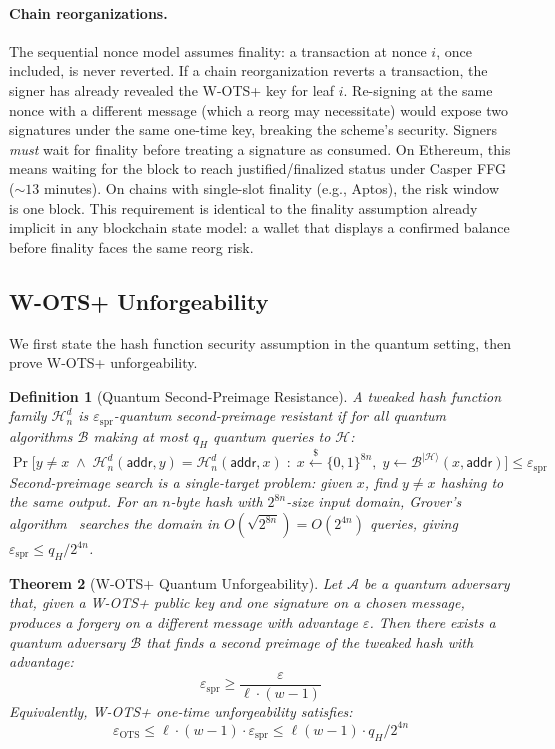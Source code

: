 \documentclass[11pt]{article}
\newtheorem{theorem}{Theorem}
\newtheorem{definition}[theorem]{Definition}
\newcommand{\hash}{\mathcal{H}}
\newcommand{\bin}{\{0,1\}}
\begin{document}
\paragraph{Chain reorganizations.}
The sequential nonce model assumes finality: a transaction at nonce $i$,
once included, is never reverted. If a chain reorganization reverts a
transaction, the signer has already revealed the W-OTS+ key for leaf
$i$. Re-signing at the same nonce with a different message (which a
reorg may necessitate) would expose two signatures under the same
one-time key, breaking the scheme's security. Signers \emph{must}
wait for finality before treating a signature as consumed. On
Ethereum, this means waiting for the block to reach justified/finalized
status under Casper FFG (${\sim}13$ minutes). On chains with
single-slot finality (e.g., Aptos), the risk window is one block.
This requirement is identical to the finality assumption already
implicit in any blockchain state model: a wallet that displays a
confirmed balance before finality faces the same reorg risk.

\subsection{W-OTS+ Unforgeability}

We first state the hash function security assumption in the quantum
setting, then prove W-OTS+ unforgeability.

\begin{definition}[Quantum Second-Preimage Resistance]\label{def:qspr}
A tweaked hash function family $\hash_n^d$ is
$\varepsilon_{\mathrm{spr}}$-quantum second-preimage resistant if for
all quantum algorithms $\mathcal{B}$ making at most $q_H$ quantum
queries to $\hash$:
\[
\Pr\bigl[y \neq x \;\wedge\; \hash_n^d(\mathsf{addr}, y) =
\hash_n^d(\mathsf{addr}, x) \;:\; x \xleftarrow{\$} \bin^{8n},\;
y \leftarrow \mathcal{B}^{|\hash\rangle}(x, \mathsf{addr})\bigr]
\leq \varepsilon_{\mathrm{spr}}
\]
Second-preimage search is a single-target problem: given $x$, find
$y \neq x$ hashing to the same output. For an $n$-byte hash with
$2^{8n}$-size input domain, Grover's algorithm~\cite{grover} searches
the domain in $O(\sqrt{2^{8n}}) = O(2^{4n})$ queries, giving
$\varepsilon_{\mathrm{spr}} \leq q_H / 2^{4n}$.
\end{definition}

\begin{theorem}[W-OTS+ Quantum Unforgeability]\label{thm:ots}
Let $\mathcal{A}$ be a quantum adversary that, given a W-OTS+ public
key and one signature on a chosen message, produces a forgery on a
different message with advantage $\varepsilon$. Then there exists a
quantum adversary $\mathcal{B}$ that finds a second preimage of the
tweaked hash with advantage:
\[
\varepsilon_{\mathrm{spr}} \geq \frac{\varepsilon}{\ell \cdot (w - 1)}
\]
Equivalently, W-OTS+ one-time unforgeability satisfies:
\[
\varepsilon_{\mathrm{OTS}} \leq \ell \cdot (w - 1) \cdot
\varepsilon_{\mathrm{spr}} \leq \ell(w-1) \cdot q_H / 2^{4n}
\]
\end{theorem}
\end{document}
